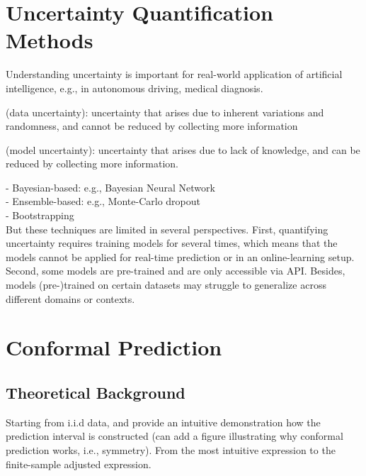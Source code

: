 \documentclass[a4paper,oneside,bibliography=totoc]{scrbook}
\begin{document}
\section{Uncertainty Quantification Methods}
Understanding uncertainty is important for real-world application of artificial intelligence, e.g., in autonomous driving, medical diagnosis. 

\begin{description}[leftmargin=0cm]
\item[Aleatory Uncertainty]  (data uncertainty): uncertainty that arises due to inherent variations and randomness, and cannot be reduced by collecting more information 

\item[Epistemic Uncertainty] (model uncertainty): uncertainty that arises due to lack of knowledge, and can be reduced by collecting more information.
\end{description}

- Bayesian-based: e.g., Bayesian Neural Network \\
- Ensemble-based: e.g., Monte-Carlo dropout \\
- Bootstrapping \\
But these techniques are limited in several perspectives. First, quantifying uncertainty requires training models for several times, which means that the models cannot be applied for real-time prediction or in an online-learning setup. Second, some models are pre-trained and are only accessible via API. Besides, models (pre-)trained on certain datasets may struggle to generalize across different domains or contexts. 

\section{Conformal Prediction}
\label{sec: reviewCP}

\subsection{Theoretical Background}
Starting from i.i.d data, and provide an intuitive demonstration how the prediction interval is constructed (can add a figure illustrating why conformal prediction works, i.e., symmetry). From the most intuitive expression to the finite-sample adjusted expression. 
		
\end{document}
